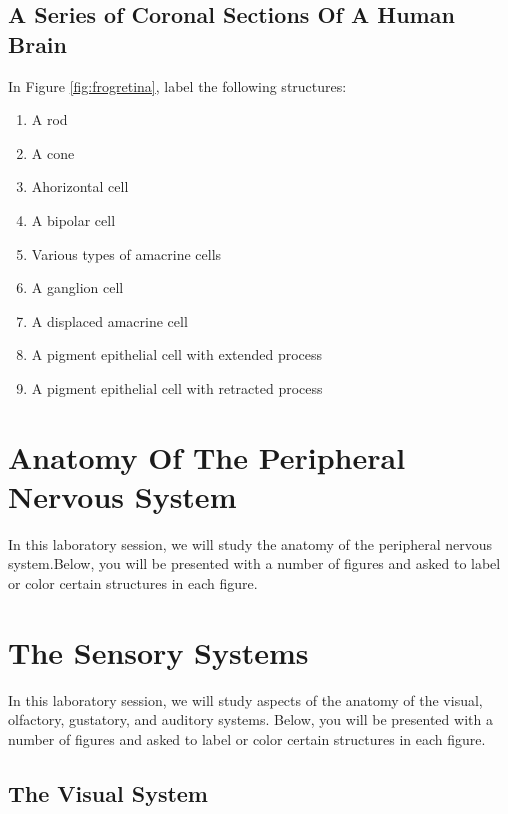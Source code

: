 \documentclass[]{book}
\providecommand{\tightlist}{%
  \setlength{\itemsep}{0pt}\setlength{\parskip}{0pt}}
\begin{document}
\hypertarget{a-series-of-coronal-sections-of-a-human-brain-4}{%
\section{A Series of Coronal Sections Of A Human Brain}\label{a-series-of-coronal-sections-of-a-human-brain-4}}

In Figure \ref{fig:frogretina}, label the following structures:

\begin{enumerate}
\def\labelenumi{\arabic{enumi}.}
\tightlist
\item
  A rod
\item
  A cone
\item
  Ahorizontal cell
\item
  A bipolar cell
\item
  Various types of amacrine cells
\item
  A ganglion cell
\item
  A displaced amacrine cell
\item
  A pigment epithelial cell with extended process
\item
  A pigment epithelial cell with retracted process
\end{enumerate}

\hypertarget{anatomy-of-the-peripheral-nervous-system}{%
\chapter{Anatomy Of The Peripheral Nervous System}\label{anatomy-of-the-peripheral-nervous-system}}

In this laboratory session, we will study the anatomy of the peripheral nervous system.Below, you will be presented with a number of figures and asked to label or color certain structures in each figure.

\hypertarget{the-sensory-systems}{%
\chapter{The Sensory Systems}\label{the-sensory-systems}}

In this laboratory session, we will study aspects of the anatomy of the visual, olfactory, gustatory, and auditory systems. Below, you will be presented with a number of figures and asked to label or color certain structures in each figure.

\hypertarget{the-visual-system}{%
\section{The Visual System}\label{the-visual-system}}
\end{document}
